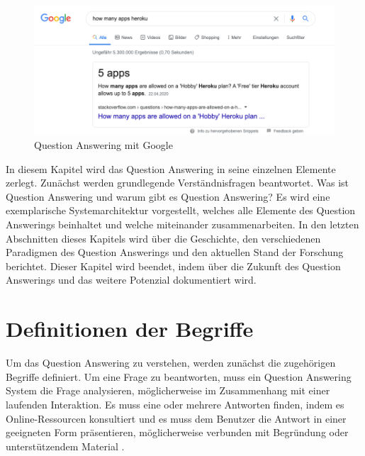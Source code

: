 \documentclass[
        ngerman,
        paper=a4,
        numbers=noendperiod,
]{scrreprt}
\begin{document}
\begin{figure}[H]
    \centering\includegraphics[width=1\linewidth]{images/google.png}
    \caption[Question Answering mit Google]{Question Answering mit Google}
    \label{fig:google}
\end{figure}

In diesem Kapitel wird das Question Answering in seine einzelnen Elemente zerlegt. Zunächst werden grundlegende Verständnisfragen beantwortet. Was ist Question Answering und warum gibt es Question Answering?
Es wird eine exemplarische Systemarchitektur vorgestellt, welches alle Elemente des Question Answerings beinhaltet und welche miteinander zusammenarbeiten. 
In den letzten Abschnitten dieses Kapitels wird über die Geschichte, den verschiedenen Paradigmen des Question Answerings und den aktuellen Stand der Forschung berichtet. Dieser Kapitel wird beendet, indem über die Zukunft des Question Answerings und das weitere Potenzial dokumentiert wird.
\section{Definitionen der Begriffe}
Um das Question Answering zu verstehen, werden zunächst die zugehörigen Begriffe definiert. Um eine Frage zu beantworten, muss ein Question Answering System die Frage analysieren, möglicherweise im Zusammenhang mit einer laufenden Interaktion. Es muss eine oder mehrere Antworten finden, indem es Online-Ressourcen konsultiert und es muss dem Benutzer die Antwort in einer geeigneten Form präsentieren, möglicherweise verbunden mit Begründung oder unterstützendem Material \citep[S. 276]{Hirschman2001NaturalHere}. 
\end{document}
